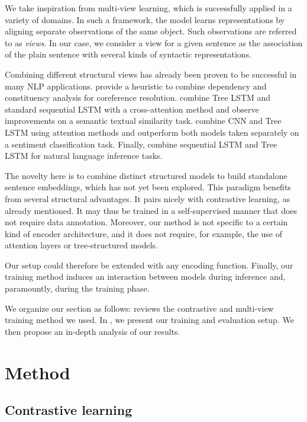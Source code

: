 We take inspiration from multi-view learning, which is successfully applied in a variety of domains. In such a framework, the model learns representations by aligning separate observations of the same object. Such observations are referred to as \textit{views}. In our case, we consider a view for a given sentence as the association of the plain sentence with several kinds of syntactic representations. 

Combining different structural views has already been proven to be successful in many NLP applications. \textcite{kong_11} provide a heuristic to combine dependency and constituency analysis for coreference resolution. \textcite{zhou_16, ahmed_19_2} combine Tree LSTM and standard sequential LSTM with a cross-attention method and observe improvements on a semantic textual similarity task. \textcite{chen_liu_17} combine CNN and Tree LSTM using attention methods and outperform both models taken separately on a sentiment classification task. Finally, \textcite{chen_17} combine sequential LSTM and Tree LSTM for natural language inference tasks. 

The novelty here is to combine distinct structured models to build standalone sentence embeddings, which has not yet been explored. This paradigm benefits from several structural advantages. It pairs nicely with contrastive learning, as already mentioned. It may thus be trained in a self-supervised manner that does not require data annotation. Moreover, our method is not specific to a certain kind of encoder architecture, and it does not require, for example, the use of attention layers or tree-structured models.

Our setup could therefore be extended with any encoding function. Finally, our training method induces an interaction between models during inference and, paramountly, during the training phase.

We organize our section as follows:  reviews the contrastive and multi-view training method we used. In , we present our training and evaluation setup. We then propose an in-depth analysis of our results.

\section{Method}

\subsection{Contrastive learning}

